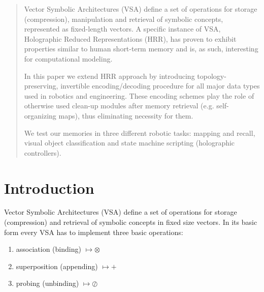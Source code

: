 \documentclass[conference]{IEEEtran}
\begin{document}
\begin{abstract}
Vector Symbolic Architectures (VSA) define a set of operations for storage (compression), manipulation and retrieval of symbolic concepts, represented as fixed-length vectors. A specific instance of VSA, Holographic Reduced Representations (HRR), has proven to exhibit properties similar to human short-term memory and is, as such, interesting for computational modeling.

In this paper we extend HRR approach by introducing topology-preserving, invertible encoding/decoding procedure for all major data types used in robotics and engineering. These encoding schemes play the role of otherwise used clean-up modules after memory retrieval (e.g. self-organizing maps), thus eliminating necessity for them.

We test our memories in three different robotic tasks: mapping and recall, visual object classification and state machine scripting (holographic controllers).
\end{abstract}





%
\IEEEpeerreviewmaketitle



\section{Introduction}

Vector Symbolic Architectures (VSA) define a set of operations for storage (compression) and retrieval of symbolic concepts in fixed size vectors. In its basic form every VSA has to implement three basic operations:
\begin{enumerate}
\item association (binding) $\mapsto \otimes$
\item superposition (appending) $\mapsto +$
\item probing (unbinding) $\mapsto \oslash$
\end{enumerate}
\end{document}
